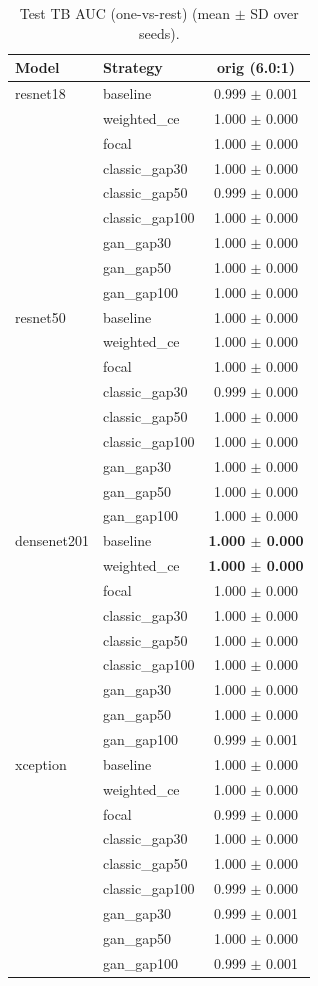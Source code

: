 \begin{table}[htbp]
\centering
\caption{Test TB AUC (one-vs-rest) (mean $\pm$ SD over seeds).}
\label{tab:tb_auc}
\begin{tabular}{llc}
\toprule
Model & Strategy & orig (6.0:1) \\
\midrule
resnet18 & baseline & 0.999 $\pm$ 0.001 \\
 & weighted\_ce & 1.000 $\pm$ 0.000 \\
 & focal & 1.000 $\pm$ 0.000 \\
 & classic\_gap30 & 1.000 $\pm$ 0.000 \\
 & classic\_gap50 & 0.999 $\pm$ 0.000 \\
 & classic\_gap100 & 1.000 $\pm$ 0.000 \\
 & gan\_gap30 & 1.000 $\pm$ 0.000 \\
 & gan\_gap50 & 1.000 $\pm$ 0.000 \\
 & gan\_gap100 & 1.000 $\pm$ 0.000 \\
\addlinespace
resnet50 & baseline & 1.000 $\pm$ 0.000 \\
 & weighted\_ce & 1.000 $\pm$ 0.000 \\
 & focal & 1.000 $\pm$ 0.000 \\
 & classic\_gap30 & 0.999 $\pm$ 0.000 \\
 & classic\_gap50 & 1.000 $\pm$ 0.000 \\
 & classic\_gap100 & 1.000 $\pm$ 0.000 \\
 & gan\_gap30 & 1.000 $\pm$ 0.000 \\
 & gan\_gap50 & 1.000 $\pm$ 0.000 \\
 & gan\_gap100 & 1.000 $\pm$ 0.000 \\
\addlinespace
densenet201 & baseline & \textbf{1.000 $\pm$ 0.000} \\
 & weighted\_ce & \textbf{1.000 $\pm$ 0.000} \\
 & focal & 1.000 $\pm$ 0.000 \\
 & classic\_gap30 & 1.000 $\pm$ 0.000 \\
 & classic\_gap50 & 1.000 $\pm$ 0.000 \\
 & classic\_gap100 & 1.000 $\pm$ 0.000 \\
 & gan\_gap30 & 1.000 $\pm$ 0.000 \\
 & gan\_gap50 & 1.000 $\pm$ 0.000 \\
 & gan\_gap100 & 0.999 $\pm$ 0.001 \\
\addlinespace
xception & baseline & 1.000 $\pm$ 0.000 \\
 & weighted\_ce & 1.000 $\pm$ 0.000 \\
 & focal & 0.999 $\pm$ 0.000 \\
 & classic\_gap30 & 1.000 $\pm$ 0.000 \\
 & classic\_gap50 & 1.000 $\pm$ 0.000 \\
 & classic\_gap100 & 0.999 $\pm$ 0.000 \\
 & gan\_gap30 & 0.999 $\pm$ 0.001 \\
 & gan\_gap50 & 1.000 $\pm$ 0.000 \\
 & gan\_gap100 & 0.999 $\pm$ 0.001 \\
\bottomrule
\end{tabular}
\end{table}